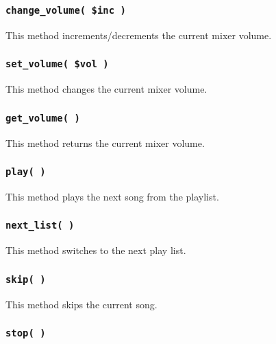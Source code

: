 \subsubsection*{\texttt{change\_volume( \$inc )}\label{xpl-mplayer_change_volume_inc_}}


This method increments/decrements the current mixer volume.

\subsubsection*{\texttt{set\_volume( \$vol )}\label{xpl-mplayer_set_volume_vol_}}


This method changes the current mixer volume.

\subsubsection*{\texttt{get\_volume( )}\label{xpl-mplayer_get_volume_}}


This method returns the current mixer volume.

\subsubsection*{\texttt{play( )}\label{xpl-mplayer_play_}}


This method plays the next song from the playlist.

\subsubsection*{\texttt{next\_list( )}\label{xpl-mplayer_next_list_}}


This method switches to the next play list.

\subsubsection*{\texttt{skip( )}\label{xpl-mplayer_skip_}}


This method skips the current song.

\subsubsection*{\texttt{stop( )}\label{xpl-mplayer_stop_}}


